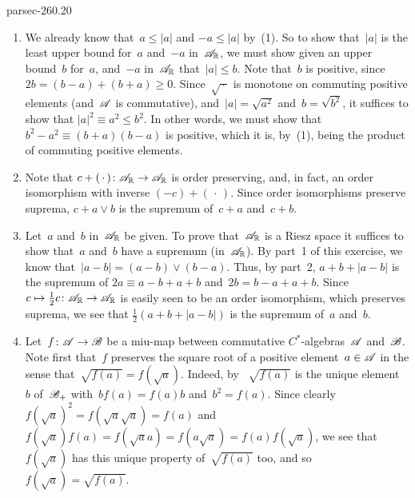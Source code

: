 \documentclass[b5page]{book}
\begin{document}
\begin{solution}{parsec-260.20}
\begin{enumerate}
\item
We already know that~$a\leq \left|a\right|$
and $-a\leq \left|a\right|$ by~(1).
So to show that~$\left|a\right|$
is the least upper bound for~$a$ and~$-a$
    in~$\mathscr{A}_{\mathbb{R}}$,
we must show
    given an upper bound~$b$ for~$a$, and~$-a$ in~$\mathscr{A}_{\mathbb{R}}$
that~$\left|a\right|\leq b$.
        Note that~$b$ is positive,
        since~$2b=(b-a)+(b+a)\geq 0$.
        Since~$\sqrt{\,\cdot\,}$ is monotone
        on commuting positive elements
        (and~$\mathscr{A}$ is commutative),
        and~$\left|a\right|=\sqrt{a^2}$ and~$b=\sqrt{b^2}$,
        it suffices to show that
        $\left|a\right|^2\equiv a^2 \leq b^2$.
In other words,
we must show that~$b^2-a^2\equiv (b+a)(b-a)$ is positive,
which it is,
by~(1),
being the product of commuting positive elements.
\item
Note that $c+(\,\cdot\,)\colon \mathscr{A}_{\mathbb{R}}\to\mathscr{A}_{\mathbb{R}}$
is order preserving,
and, in fact,
an order isomorphism
with inverse $(-c)+(\,\cdot\,)$.
Since order isomorphisms preserve suprema,
$c+a\vee b$ is the supremum
of~$c+a$ and~$c+b$.
\item
Let~$a$ and~$b$ in~$\mathscr{A}_{\mathbb{R}}$
be given.
To prove that~$\mathscr{A}_{\mathbb{R}}$
is a Riesz space
it suffices to show that~$a$ and~$b$ have a supremum
(in~$\mathscr{A}_{\mathbb{R}}$).
By part~1 of this exercise,
we know that~$\left|a-b\right|=(a-b)\vee (b-a)$.
Thus,
by part~2, 
$a+b+\left|a-b\right|$
is the supremum of $2a\equiv a-b+a+b$
and~$2b=b-a+a+b$.
Since~$c\mapsto \frac{1}{2}c\colon \mathscr{A}_{\mathbb{R}}\to\mathscr{A}_{\mathbb{R}}$
is easily seen to be an order isomorphism,
which preserves suprema,
we see that $\frac{1}{2}(a+b+\left|a-b\right|)$
is the supremum of~$a$ and~$b$.
\item
Let~$f\colon \mathscr{A}\to\mathscr{B}$
be a miu-map between commutative 
$C^*$-algebras~$\mathscr{A}$ and~$\mathscr{B}$.
Note first that~$f$ preserves the square root
of a positive element~$a\in\mathscr{A}$
in the sense that~$\sqrt{f(a)} = f(\sqrt{a})$.
Indeed, 
by~
$\sqrt{f(a)}$
 is the unique element~$b$ of~$\mathscr{B}_+$
with~$bf(a)=f(a)b$ and~$b^2=f(a)$.
Since clearly  $f(\sqrt{a})^2 = f(\sqrt{a}\sqrt{a})=f(a)$
and~$f(\sqrt{a})f(a)=f(\sqrt{a}a)=f(a\sqrt{a})=f(a)f(\sqrt{a})$,
we see that~$f(\sqrt{a})$ has this unique property of~$\sqrt{f(a)}$
too,
and so $f(\sqrt{a})=\sqrt{f(a)}$.


\end{enumerate}
\end{solution}
\end{document}
